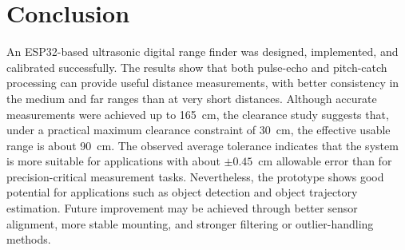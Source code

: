 \section{Conclusion}
An ESP32-based ultrasonic digital range finder was designed,
implemented, and calibrated successfully. The results show that both
pulse-echo and pitch-catch processing can provide useful distance
measurements, with better consistency in the medium and far ranges than
at very short distances. Although accurate measurements were achieved up to
165~cm, the clearance study suggests that, under a practical maximum
clearance constraint of 30~cm, the effective usable range is about
90~cm. The observed average tolerance indicates that the system is more
suitable for applications with about $\pm 0.45$~cm allowable error than
for precision-critical measurement tasks. Nevertheless, the prototype
shows good potential for applications such as object detection and
object trajectory estimation. Future improvement may be achieved
through better sensor alignment, more stable mounting, and stronger
filtering or outlier-handling methods.
